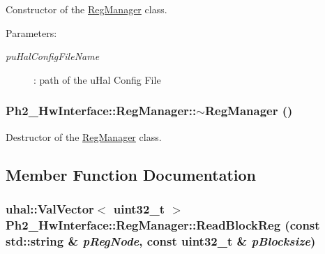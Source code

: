 Constructor of the \hyperlink{class_ph2___hw_interface_1_1_reg_manager}{Reg\-Manager} class. 

\begin{Desc}
\item[Parameters:]
\begin{description}
\item[{\em pu\-Hal\-Config\-File\-Name}]: path of the u\-Hal Config File \end{description}
\end{Desc}
\hypertarget{class_ph2___hw_interface_1_1_reg_manager_5d650c4e6467153f98f999abbbfc354c}{
\subsubsection[$\sim$RegManager]{\setlength{\rightskip}{0pt plus 5cm}Ph2\_\-Hw\-Interface::Reg\-Manager::$\sim$Reg\-Manager ()}}
\label{class_ph2___hw_interface_1_1_reg_manager_5d650c4e6467153f98f999abbbfc354c}


Destructor of the \hyperlink{class_ph2___hw_interface_1_1_reg_manager}{Reg\-Manager} class. 



\subsection{Member Function Documentation}
\hypertarget{class_ph2___hw_interface_1_1_reg_manager_6481c211d27badc409ff0e7af20575e4}{
\subsubsection[ReadBlockReg]{\setlength{\rightskip}{0pt plus 5cm}uhal::Val\-Vector$<$ uint32\_\-t $>$ Ph2\_\-Hw\-Interface::Reg\-Manager::Read\-Block\-Reg (const std::string \& {\em p\-Reg\-Node}, const uint32\_\-t \& {\em p\-Blocksize})}}
\label{class_ph2___hw_interface_1_1_reg_manager_6481c211d27badc409ff0e7af20575e4}


